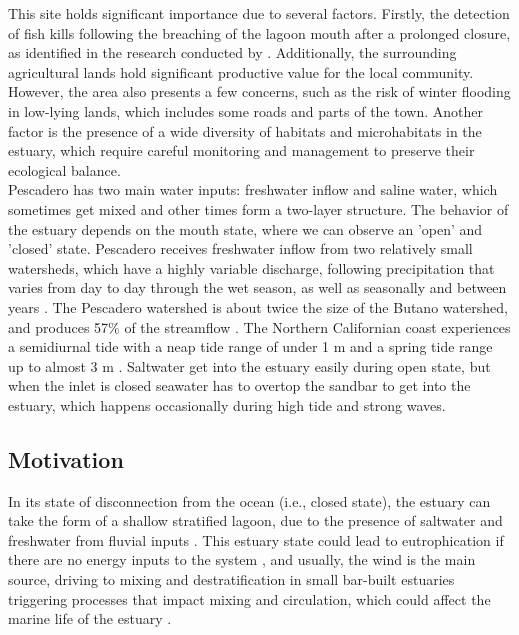 \documentclass[tesis.tex]{subfiles}
\begin{document}
This site holds significant importance due to several factors. Firstly, the detection of fish kills following the breaching of the lagoon mouth after a prolonged closure, as identified in the research conducted by \cite{largier2015}. Additionally, the surrounding agricultural lands hold significant productive value for the local community. However, the area also presents a few concerns, such as the risk of winter flooding in low-lying lands, which includes some roads and parts of the town. Another factor is the presence of a wide diversity of habitats and microhabitats in the estuary, which require careful monitoring and management to preserve their ecological balance.\\

Pescadero has two main water inputs: freshwater inflow and saline water, which sometimes get mixed and other times form a two-layer structure. The behavior of the estuary depends on the mouth state, where we can observe an 'open' and 'closed' state. Pescadero receives freshwater inflow from two relatively small watersheds, which have a highly variable discharge, following precipitation that varies from day to day through the wet season, as well as seasonally and between years \citep{largier2015}. The Pescadero watershed is about twice the size of the Butano watershed, and produces 57\% of the streamflow \citep{Williams2014}. The Northern Californian coast experiences a semidiurnal tide with a neap tide range of under 1 m and a spring tide range up to almost 3 m \citep{Williams2014}. Saltwater get into the estuary easily during open state, but when the inlet is closed seawater has to overtop the sandbar to get into the estuary, which happens occasionally during high tide and strong waves.\\

\subsection{Motivation}

In its state of disconnection from the ocean (i.e., closed state), the estuary can take the form of a shallow stratified lagoon, due to the presence of saltwater and freshwater from fluvial inputs \citep{Behrens2016}. This estuary state could lead to eutrophication if there are no energy inputs to the system \citep{nunes2014responses}, and usually, the wind is the main source, driving to mixing and destratification in small bar-built estuaries \citep{Gale2006} triggering processes that impact mixing and circulation, which could affect the marine life of the estuary \citep{marti2008relating}. \\
\end{document}
